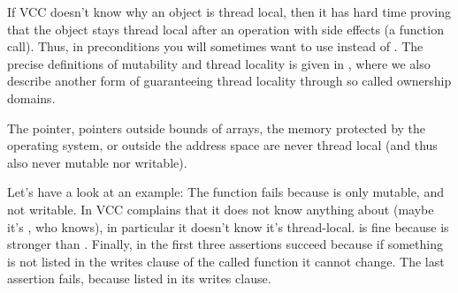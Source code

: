 \begin{note}
If VCC doesn't know why an object is thread local, then it has
hard time proving that the object stays thread local after an operation
with side effects (\eg a function call).
Thus, in preconditions you will sometimes want to use
 instead of .
The precise definitions of mutability and thread locality
is given in ,
where we also describe another form of guaranteeing thread locality
through so called ownership domains.
\end{note}

The  pointer, pointers outside bounds of arrays,
the memory protected by the operating system, or outside
the address space are never thread local (and thus also never mutable
nor writable).

Let's have a look at an example:
\noindent
The function  fails because  is only
mutable, and not writable.
In  VCC complains that it does not know
anything about  (maybe it's , who knows),
in particular it doesn't know it's thread-local.
 is fine because \vcc{\mutable} is stronger
than .
Finally, in  the first three assertions succeed
because if something is not listed in the writes clause
of the called function it cannot change.
The last assertion fails, because  listed 
in its writes clause.



